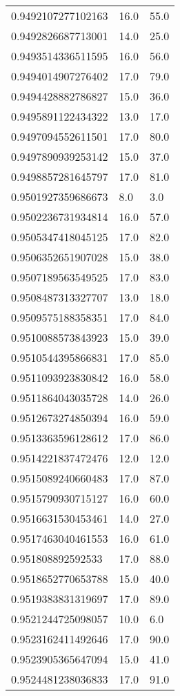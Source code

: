 \begin{center}
\begin{supertabular}[H]{p{0.30\textwidth}p{0.05\textwidth}p{0.05\textwidth}}
0.9492107277102163 & 16.0 & 55.0 \\ 
0.9492826687713001 & 14.0 & 25.0 \\ 
0.9493514336511595 & 16.0 & 56.0 \\ 
0.9494014907276402 & 17.0 & 79.0 \\ 
0.9494428882786827 & 15.0 & 36.0 \\ 
0.9495891122434322 & 13.0 & 17.0 \\ 
0.9497094552611501 & 17.0 & 80.0 \\ 
0.9497890939253142 & 15.0 & 37.0 \\ 
0.9498857281645797 & 17.0 & 81.0 \\ 
0.9501927359686673 & 8.0 & 3.0 \\ 
0.9502236731934814 & 16.0 & 57.0 \\ 
0.9505347418045125 & 17.0 & 82.0 \\ 
0.9506352651907028 & 15.0 & 38.0 \\ 
0.9507189563549525 & 17.0 & 83.0 \\ 
0.9508487313327707 & 13.0 & 18.0 \\ 
0.9509575188358351 & 17.0 & 84.0 \\ 
0.9510088573843923 & 15.0 & 39.0 \\ 
0.9510544395866831 & 17.0 & 85.0 \\ 
0.9511093923830842 & 16.0 & 58.0 \\ 
0.9511864043035728 & 14.0 & 26.0 \\ 
0.9512673274850394 & 16.0 & 59.0 \\ 
0.9513363596128612 & 17.0 & 86.0 \\ 
0.9514221837472476 & 12.0 & 12.0 \\ 
0.9515089240660483 & 17.0 & 87.0 \\ 
0.9515790930715127 & 16.0 & 60.0 \\ 
0.9516631530453461 & 14.0 & 27.0 \\ 
0.9517463040461553 & 16.0 & 61.0 \\ 
0.951808892592533 & 17.0 & 88.0 \\ 
0.9518652770653788 & 15.0 & 40.0 \\ 
0.9519383831319697 & 17.0 & 89.0 \\ 
0.9521244725098057 & 10.0 & 6.0 \\ 
0.9523162411492646 & 17.0 & 90.0 \\ 
0.9523905365647094 & 15.0 & 41.0 \\ 
0.9524481238036833 & 17.0 & 91.0 \\ 

\end{supertabular}
\end{center}
